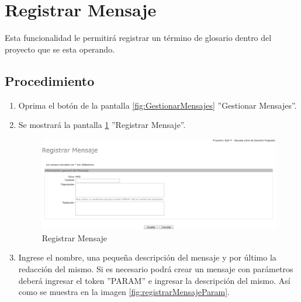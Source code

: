 \hypertarget{cv:registrarMensaje}{\section{Registrar Mensaje}} \label{sec:registrarMensaje}

	Esta funcionalidad le permitirá registrar un término de glosario dentro del proyecto que se esta operando. 

		\subsection{Procedimiento}

			\begin{enumerate}
	
			\item Oprima el botón \IURegistrar{} de la pantalla \ref{fig:GestionarMensajes} ''Gestionar Mensajes''.
			
			\item Se mostrará la pantalla \ref{fig:registrarMensaje} ''Registrar Mensaje''.

			\begin{figure}[htbp!]
				\begin{center}
					\includegraphics[scale=0.5]{roles/lider/mensajes/pantallas/IU9-1registrarMensaje}
					\caption{Registrar Mensaje}
					\label{fig:registrarMensaje}
				\end{center}
			\end{figure}
		
			\item Ingrese el nombre, una pequeña descripción del mensaje y por último la redacción del mismo. Si es necesario podrá crear un mensaje con parámetros deberá ingresar el token ''PARAM'' e ingresar la descripción del mismo. Así como se muestra en la imagen \ref{fig:registrarMensajeParam}.
			

\end{enumerate}
